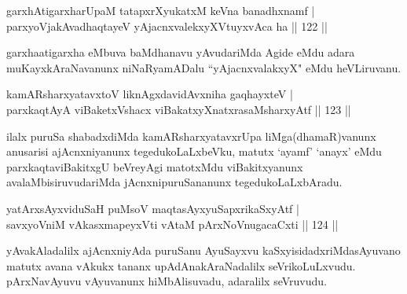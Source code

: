 
\begin{shl}
garxhAtigarxharUpaM tatapxrXyukatxM keVna banadhxnamf |\\
parxyoVjakAvadhaqtayeV yAjacnxvalekxyXVtuyxvAca ha \hfill || 122 ||
\end{shl}

\begin{artha}
garxhaatigarxha eMbuva baMdhanavu yAvudariMda Agide eMdu adara muKayxkAraNavanunx niNaRyamADalu ``yAjacnxvalakxyX" eMdu heVLiruvanu.
\end{artha}



\begin{shl}
kamARsharxyatavxtoV liknAgxdavidAvxniha gaqhayxteV |\\
parxkaqtAyA viBaketxVshacx viBakatxyXnatxrasaMsharxyAtf \hfill || 123 ||
\end{shl}

\begin{artha}
ilalx puruSa shabadxdiMda kamARsharxyatavxrUpa liMga(dhamaR)vanunx anusarisi ajAcnxniyanunx tegedukoLaLxbeVku, matutx `ayamf' `anayx' eMdu parxkaqtaviBakitxgU beVreyAgi matotxMdu viBakitxyanunx avalaMbisiruvudariMda jAcnxnipuruSananunx tegedukoLaLxbAradu.
\end{artha}

\begin{shl}
yatArxsAyxviduSaH puMsoV maqtasAyx\s \s yuSapxrikaSxyAtf |\\
savxyoVniM vAkasxmapeyxVti vAtaM pArxNoV\s nugacaCxti \hfill || 124 ||
\end{shl}

\begin{artha}
yAvakAladalilx ajAcnxniyAda puruSanu AyuSayxvu kaSxyisidadxriMda\break sAyuvano matutx avana vAkukx tananx upAdAnakAraNadalilx seVrikoLuLxvudu. pArxNavAyuvu vAyuvanunx hiMbAlisuvadu, adaralilx seVruvudu.
\end{artha}


